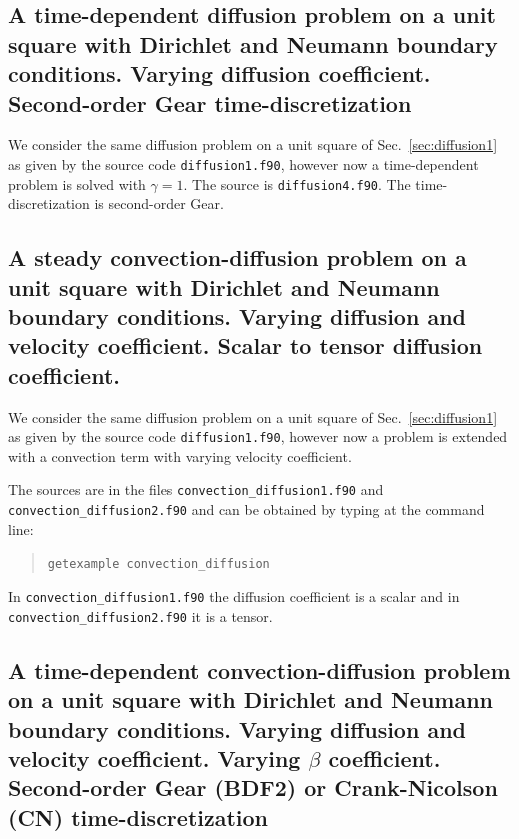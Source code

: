 \subsection{A time-dependent diffusion problem on a unit square with Dirichlet
            and Neumann boundary conditions. Varying diffusion coefficient.
            Second-order Gear time-discretization}

\label{sec:diffusion2}

We consider the same 
diffusion problem on a unit square of Sec.~\ref{sec:diffusion1} as given by
the source code \texttt{diffusion1.f90}, however
now a time-dependent problem is solved with $\gamma=1$.
The source is \texttt{diffusion4.f90}.
The time-discretization is second-order Gear.

\subsection{A steady convection-diffusion problem on a unit square with
            Dirichlet and Neumann boundary conditions.
            Varying diffusion and velocity coefficient.
            Scalar to tensor diffusion coefficient.}

\label{sec:convectiondiffusion1}

We consider the same 
diffusion problem on a unit square of Sec.~\ref{sec:diffusion1} as given by
the source code \texttt{diffusion1.f90}, however
now a problem is extended with a convection term with varying velocity
coefficient.

The sources are
in the files \texttt{convection\_diffusion1.f90}
and \texttt{convection\_diffusion2.f90} 
 and can be obtained by typing at the
command line:
\begin{quote}
   \texttt{getexample convection\_diffusion}
\end{quote}
In \texttt{convection\_diffusion1.f90} the diffusion coefficient is a scalar
and in \texttt{convection\_diffusion2.f90} it is a tensor.

\subsection{A time-dependent convection-diffusion problem on a unit square with
            Dirichlet and Neumann boundary conditions.
            Varying diffusion and velocity coefficient.
            Varying $\beta$ coefficient.
            Second-order Gear (BDF2) or Crank-Nicolson (CN)
            time-discretization}

\label{sec:convectiondiffusion2}

